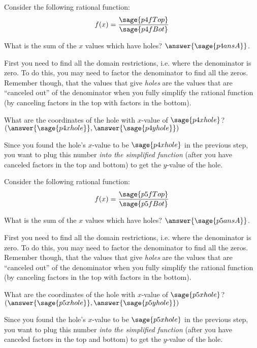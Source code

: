 \documentclass{ximera}
\begin{document}
\begin{problem}
    Consider the following rational function:
    \[
        f(x) = \frac{\sage{p4fTop}}{\sage{p4fBot}}
    \]
    
    What is the sum of the $x$ values which have holes? $\answer{\sage{p4ansA}}$.
    \begin{feedback}
        First you need to find all the domain restrictions, i.e. where the denominator is zero. To do this, you may need to factor the denominator to find all the zeros. Remember though, that the values that give \textit{holes} are the values that are ``canceled out'' of the denominator when you fully simplify the rational function (by canceling factors in the top with factors in the bottom).
    \end{feedback}
    \begin{problem}
        What are the coordinates of the hole with $x$-value of $\sage{p4xhole}$? $(\answer{\sage{p4xhole}},\answer{\sage{p4yhole}})$
        \begin{feedback}
            Since you found the hole's $x$-value to be $\sage{p4xhole}$ in the previous step, you want to plug this number \textit{into the simplified function} (after you have canceled factors in the top and bottom) to get the $y$-value of the hole.
        \end{feedback}
    \end{problem}

\end{problem}


\begin{problem}
    Consider the following rational function:
    \[
        f(x) = \frac{\sage{p5fTop}}{\sage{p5fBot}}
    \]
    
    What is the sum of the $x$ values which have holes? $\answer{\sage{p5ansA}}$.
    \begin{feedback}
        First you need to find all the domain restrictions, i.e. where the denominator is zero. To do this, you may need to factor the denominator to find all the zeros. Remember though, that the values that give \textit{holes} are the values that are ``canceled out'' of the denominator when you fully simplify the rational function (by canceling factors in the top with factors in the bottom).
    \end{feedback}
    \begin{problem}
        What are the coordinates of the hole with $x$-value of $\sage{p5xhole}$? $(\answer{\sage{p5xhole}},\answer{\sage{p5yhole}})$
        \begin{feedback}
            Since you found the hole's $x$-value to be $\sage{p5xhole}$ in the previous step, you want to plug this number \textit{into the simplified function} (after you have canceled factors in the top and bottom) to get the $y$-value of the hole.
        \end{feedback}
    \end{problem}

\end{problem}
\end{document}
